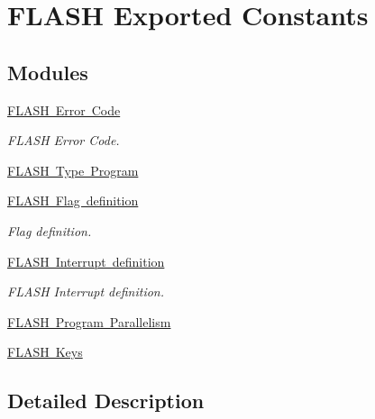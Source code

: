 \hypertarget{group___f_l_a_s_h___exported___constants}{}\section{F\+L\+A\+SH Exported Constants}
\label{group___f_l_a_s_h___exported___constants}
\subsection*{Modules}
\begin{DoxyCompactItemize}
\item 
\mbox{\hyperlink{group___f_l_a_s_h___error___code}{F\+L\+A\+S\+H Error Code}}
\begin{DoxyCompactList}\small\item\em F\+L\+A\+SH Error Code. \end{DoxyCompactList}\item 
\mbox{\hyperlink{group___f_l_a_s_h___type___program}{F\+L\+A\+S\+H Type Program}}
\item 
\mbox{\hyperlink{group___f_l_a_s_h___flag__definition}{F\+L\+A\+S\+H Flag definition}}
\begin{DoxyCompactList}\small\item\em Flag definition. \end{DoxyCompactList}\item 
\mbox{\hyperlink{group___f_l_a_s_h___interrupt__definition}{F\+L\+A\+S\+H Interrupt definition}}
\begin{DoxyCompactList}\small\item\em F\+L\+A\+SH Interrupt definition. \end{DoxyCompactList}\item 
\mbox{\hyperlink{group___f_l_a_s_h___program___parallelism}{F\+L\+A\+S\+H Program Parallelism}}
\item 
\mbox{\hyperlink{group___f_l_a_s_h___keys}{F\+L\+A\+S\+H Keys}}
\end{DoxyCompactItemize}


\subsection{Detailed Description}
